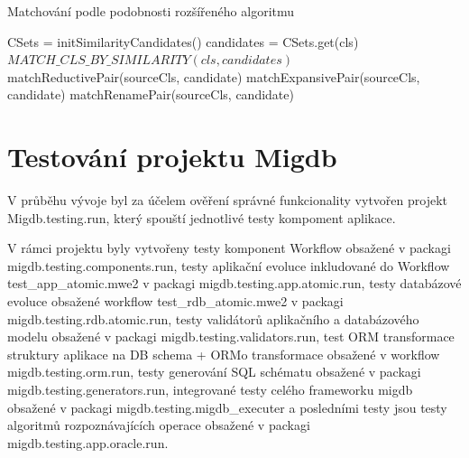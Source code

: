 \documentclass[11pt,twoside,a4paper]{book}
\begin{document}
\FloatBarrier
 
\begin{algorithm}
 \caption{Matchování podle podobnosti rozšířeného
 algoritmu}\label{algo:matching_ext:match_similarity}
 \begin{algorithmic}[1]
    \State CSets = initSimilarityCandidates() 
          \State candidates = CSets.get(cls)
          \State $MATCH\_CLS\_BY\_SIMILARITY(cls, candidates)$
       \EndFor
    \EndFor
 \EndProcedure
 \Statex
 	         \State {}\label{algo:matching_ext:modifying
 	         operation}
 	      \Else
 	         \State matchReductivePair(sourceCls, candidate)
 	         \label{algo:matching_ext:reductive_pair}
 	      \EndIf
 	   \Else
 	         \State matchExpansivePair(sourceCls,
 	         candidate)\label{algo:matching_ext:expansive_pair}
 	      \Else
 	         \State matchRenamePair(sourceCls,
 	         candidate)\label{algo:matching_ext:rename_pair}
 	      \EndIf
 	   \EndIf 
 	\EndFor
 \EndProcedure
 \end{algorithmic}
\end{algorithm}

\FloatBarrier


\chapter{Testování projektu Migdb}\label{chapt:testování}

V průběhu vývoje byl za účelem ověření správné funkcionality vytvořen projekt
Migdb.testing.run, který spouští jednotlivé testy kompoment aplikace. 

V rámci projektu byly vytvořeny testy komponent Workflow obsažené v packagi
migdb.testing.components.run, testy aplikační evoluce inkludované do Workflow
test\_app\_atomic.mwe2 v packagi migdb.testing.app.atomic.run, testy databázové
evoluce obsažené workflow test\_rdb\_atomic.mwe2 v packagi
migdb.testing.rdb.atomic.run, testy validátorů aplikačního a databázového
modelu obsažené v packagi migdb.testing.validators.run, test ORM transformace
struktury aplikace na DB schema + ORMo transformace obsažené v workflow
migdb.testing.orm.run, testy generování SQL schématu obsažené v packagi
migdb.testing.generators.run, integrované testy celého frameworku migdb
obsažené v packagi migdb.testing.migdb\_executer a posledními testy jsou testy
algoritmů rozpoznávajících operace obsažené v packagi
migdb.testing.app.oracle.run.
\end{document}
